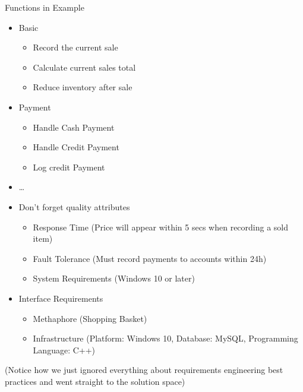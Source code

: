 \documentclass[10pt,t,a4paper]{beamer}
\begin{document}
\begin{frame}[label=sec-1-3]{Functions in Example}
\begin{itemize}
\item Basic
\begin{itemize}
\item Record the current sale
\item Calculate current sales total
\item Reduce inventory after sale
\end{itemize}
\item Payment
\begin{itemize}
\item Handle Cash Payment
\item Handle Credit Payment
\item Log credit Payment
\end{itemize}
\item \ldots{}
\item \alert{Don't forget} quality attributes
\begin{itemize}
\item Response Time (Price will appear within 5 secs when recording a sold item)
\item Fault Tolerance (Must record payments to accounts within 24h)
\item System Requirements (Windows 10 or later)
\end{itemize}
\item Interface Requirements
\begin{itemize}
\item Methaphore (Shopping Basket)
\item Infrastructure (Platform: Windows 10, Database: MySQL, Programming Language: C++)
\end{itemize}
\end{itemize}

(Notice how we just ignored everything about requirements engineering best practices and went straight to the solution space)
\end{frame}
\end{document}
